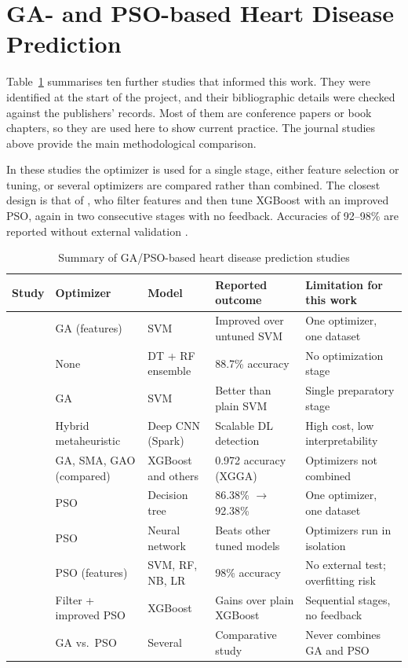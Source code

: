 \documentclass[MTech]{ugthesis}
\begin{document}
\section{GA- and PSO-based Heart Disease Prediction}
Table~\ref{tab:lit} summarises ten further studies that informed this work. They were identified at the start of the project, and their bibliographic details were checked against the publishers' records. Most of them are conference papers or book chapters, so they are used here to show current practice. The journal studies above provide the main methodological comparison.

In these studies the optimizer is used for a single stage, either feature selection or tuning, or several optimizers are compared rather than combined. The closest design is that of \citet{cao2025dlpso}, who filter features and then tune XGBoost with an improved PSO, again in two consecutive stages with no feedback. Accuracies of 92--98\% are reported without external validation \citep{majumder2025psodt,nagavelli2024pso}.

\begin{table}[htpb]
\small
\renewcommand{\arraystretch}{1.3}
\caption{Summary of GA/PSO-based heart disease prediction studies}
\label{tab:lit}
\begin{tabular}{|p{2.6cm}|p{2.4cm}|p{2.2cm}|p{3.2cm}|p{3.4cm}|}
\hline
\textbf{Study} & \textbf{Optimizer} & \textbf{Model} & \textbf{Reported outcome} & \textbf{Limitation for this work} \\ \hline
\citet{warsi2024gasvm} & GA (features) & SVM & Improved over untuned SVM & One optimizer, one dataset \\ \hline
\citet{kavitha2021hybrid} & None & DT + RF ensemble & 88.7\% accuracy & No optimization stage \\ \hline
\citet{effective2021gasvm} & GA & SVM & Better than plain SVM & Single preparatory stage \\ \hline
\citet{kanchanamala2023spark} & Hybrid metaheuristic & Deep CNN (Spark) & Scalable DL detection & High cost, low interpretability \\ \hline
\citet{zhang2024xgga} & GA, SMA, GAO (compared) & XGBoost and others & 0.972 accuracy (XGGA) & Optimizers not combined \\ \hline
\citet{majumder2025psodt} & PSO & Decision tree & 86.38\% $\rightarrow$ 92.38\% & One optimizer, one dataset \\ \hline
\citet{reddy2025psonn} & PSO & Neural network & Beats other tuned models & Optimizers run in isolation \\ \hline
\citet{nagavelli2024pso} & PSO (features) & SVM, RF, NB, LR & 98\% accuracy & No external test; overfitting risk \\ \hline
\citet{cao2025dlpso} & Filter + improved PSO & XGBoost & Gains over plain XGBoost & Sequential stages, no feedback \\ \hline
\citet{wadhawan2026gavspso} & GA vs.\ PSO & Several & Comparative study & Never combines GA and PSO \\ \hline
\end{tabular}
\end{table}
\end{document}
